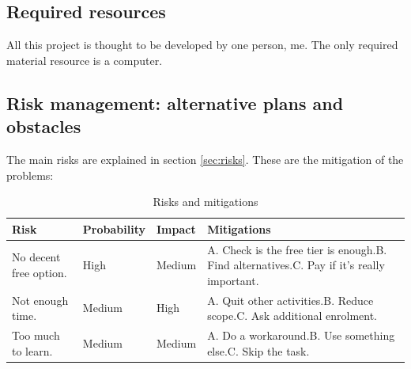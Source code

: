 \subsection{Required resources}

All this project is thought to be developed by one person, me. The only required material resource is a computer.

\subsection{Risk management: alternative plans and obstacles}

The main risks are explained in section \ref{sec:risks}. These are the mitigation of the problems:



\begin{table}[ht!]
    \centering
    \begin{singlespace}

    \begin{tabularx}{\textwidth}{lllX} 
    \toprule
    \textbf{Risk} & \textbf{Probability} & \textbf{Impact} & \textbf{Mitigations} \\
    \midrule
    \hspace{3mm}No decent free option. & High & Medium & A. Check is the free tier is enough.\newline B. Find alternatives.\newline C. Pay if it's really important.\newline \\
    \hspace{3mm}Not enough time. & Medium & High & A. Quit other activities.\newline B. Reduce scope.\newline C. Ask additional enrolment.\newline \\
    \hspace{3mm}Too much to learn. & Medium & Medium & A. Do a workaround.\newline B. Use something else.\newline C. Skip the task. \\
    \bottomrule
    \end{tabularx}
    
    \end{singlespace}
    \caption{Risks and mitigations}
    \label{risk-list}
\end{table}


